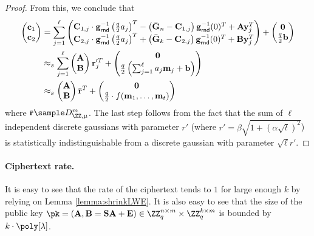 \begin{proof}
    

From this, we conclude that \begin{align*}
    \begin{pmatrix}
\mathbf{c}_1 \\ \mathbf{c}_2
\end{pmatrix} & = \sum_{j=1}^\ell \begin{pmatrix}
 \mathbf{C}_{1,j}\cdot \mathbf{g}^{-1}_{\mathsf{rnd}}\left( \frac{q}{2} a_j\right)^T-\left( \bar {\mathbf{G}}_n-\mathbf{C}_{1,j}\right)\mathbf{g}^{-1}_\mathsf{rnd}(0)^T + \mathbf{A}\mathbf{y}_j^T \\  \mathbf{C}_{2,j}\cdot\mathbf{g}^{-1}_{\mathsf{rnd}}\left( \frac{q}{2} a_j\right)^T  + \left(\bar {\mathbf{G}}_k-\mathbf{C}_{2,j}\right)\mathbf{g}^{-1}_\mathsf{rnd}(0)^T+\mathbf{B}\mathbf{y}_j^T
\end{pmatrix} + \begin{pmatrix}
\mathbf{0} \\ \frac{q}{2} \mathbf{b}
\end{pmatrix}\\ 
&\approx_s \sum_{j=1}^\ell  \begin{pmatrix}
\mathbf{A} \\ \mathbf{B}
\end{pmatrix}\mathbf{r}_j'^T  + \begin{pmatrix} \mathbf{0} \\\frac{q}{2} \left(\sum_{j=1}^\ell a_j \mathbf{m}_j + \mathbf{b}\right) \end{pmatrix}\\ 
&\approx_s   \begin{pmatrix}
\mathbf{A} \\ \mathbf{B}
\end{pmatrix}\bar {\mathbf{r}}^T  + \begin{pmatrix} \mathbf{0} \\\frac{q}{2} \cdot f(\mathbf{m}_1,\dots, \mathbf{m}_t) \end{pmatrix}\\ 
\end{align*}
where $\bar \rn\sample D_{\ZZ,\mu}^m$. The last step follows from the fact that the sum of $\ell$ independent discrete gaussians with parameter $r'$ (where $r'=\beta\sqrt{1+\left(\alpha\sqrt{t}\right)^2}$) is statistically indistinguishable from a discrete gaussian with parameter $\sqrt{\ell}r'$.
\end{proof}


\paragraph{Ciphertext rate.} It is easy to see that the rate of the ciphertext tends to $1$ for large enough $k$ by relying on Lemma \ref{lemma:shrinkLWE}. It is also easy to see that the size of the public key $\pk=(\An,\Bn=\Sn\An+\En)\in\ZZ_q^{n\times m}\times \ZZ_q^{k\times m}$ is bounded by $k\cdot \poly[\lambda]$.

